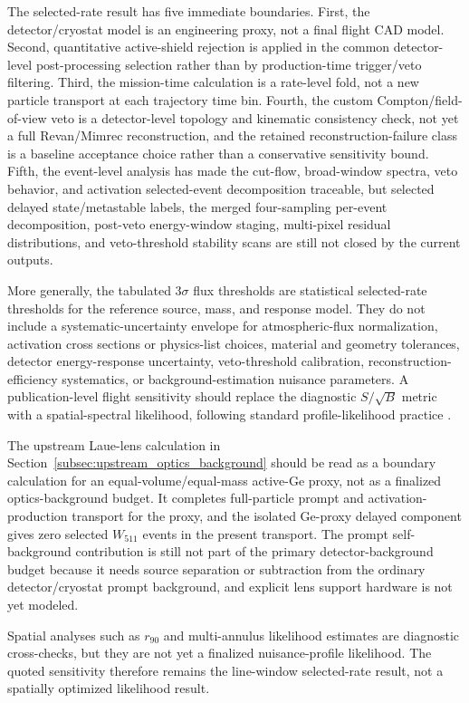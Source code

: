 \documentclass[11pt]{article}
\newcommand{\wii}{W_{511}}
\newcommand{\rewritten}[1]{{\color{green!45!black}#1}}
\begin{document}
\rewritten{The selected-rate result has five immediate boundaries. First, the detector/cryostat model is an engineering proxy, not a final flight CAD model. Second, quantitative active-shield rejection is applied in the common detector-level post-processing selection rather than by production-time trigger/veto filtering. Third, the mission-time calculation is a rate-level fold, not a new particle transport at each trajectory time bin. Fourth, the custom Compton/field-of-view veto is a detector-level topology and kinematic consistency check, not yet a full Revan/Mimrec reconstruction, and the retained reconstruction-failure class is a baseline acceptance choice rather than a conservative sensitivity bound. Fifth, the event-level analysis has made the cut-flow, broad-window spectra, veto behavior, and activation selected-event decomposition traceable, but selected delayed state/metastable labels, the merged four-sampling per-event decomposition, post-veto energy-window staging, multi-pixel residual distributions, and veto-threshold stability scans are still not closed by the current outputs.}

More generally, the tabulated $3\sigma$ flux thresholds are statistical selected-rate thresholds for the reference source, mass, and response model. They do not include a systematic-uncertainty envelope for atmospheric-flux normalization, activation cross sections or physics-list choices, material and geometry tolerances, detector energy-response uncertainty, veto-threshold calibration, reconstruction-efficiency systematics, or background-estimation nuisance parameters. A publication-level flight sensitivity should replace the diagnostic $S/\sqrt{B}$ metric with a spatial-spectral likelihood, following standard profile-likelihood practice \cite{Cowan2011}.

The upstream Laue-lens calculation in Section~\ref{subsec:upstream_optics_background} should be read as a boundary calculation for an equal-volume/equal-mass active-Ge proxy, not as a finalized optics-background budget. It completes full-particle prompt and activation-production transport for the proxy, and the isolated Ge-proxy delayed component gives zero selected $\wii$ events in the present transport. The prompt self-background contribution is still not part of the primary detector-background budget because it needs source separation or subtraction from the ordinary detector/cryostat prompt background, and explicit lens support hardware is not yet modeled.

Spatial analyses such as $r_{90}$ and multi-annulus likelihood estimates are diagnostic cross-checks, but they are not yet a finalized nuisance-profile likelihood. The quoted sensitivity therefore remains the line-window selected-rate result, not a spatially optimized likelihood result.
\end{document}
